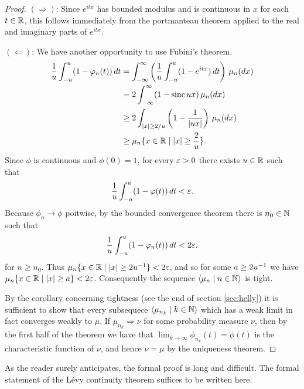 \documentclass{article}
\theoremstyle{definition}
\newcommand{\bldset}[2]{\{{#1}\mid{#2}\}}
\newcommand{\bldseq}[2]{\langle{#1}\mid{#2}\rangle}
\newcommand\sinc{\mathop{\text{sinc}}\nolimits}
\begin{document}
\begin{proof}
$(\Longrightarrow)$: Since $e^{itx}$ has bounded modulus and is continuous in $x$ for each $t \in \mathbb{R}$, this follows immediately from the portmanteau theorem applied to the real and imaginary parts of $e^{itx}$.

$(\Longleftarrow)$: We have another opportunity to use Fubini's theorem.
\begin{align*}
\frac{1}{u} \int_{-u}^u (1 - \phi_n(t)) \, dt &= \int_{-\infty}^\infty \left(\frac{1}{u}\int_{-u}^u (1 - e^{itx}) \, dt\right) \, \mu_n(dx) \\
                                              &= 2\int_{-\infty}^\infty (1 - \sinc ux) \, \mu_n(dx) \\
                                              &\ge 2\int_{|x| \ge 2/u} \left(1 - \frac{1}{|ux|}\right) \, \mu_n(dx) \\
                                              &\ge \mu_n \bldset{x \in \R}{|x| \ge \frac{2}{u}}.
\end{align*}
Since $\phi$ is continuous and $\phi(0) = 1$, for every $\varepsilon > 0$ there exists $u \in \mathbb{R}$ such that
\[ \frac{1}{u} \int_{-u}^u (1 - \varphi(t)) \, dt < \varepsilon. \]
Because $\phi_n \rightarrow \phi$ poitwise, by the bounded convergence theorem there is $n_0 \in \mathbb{N}$ such that
\[ \frac{1}{u} \int_{-u}^u (1 - \varphi_n(t)) \, dt < 2\varepsilon. \]
for $n \ge n_0$. Thus $\mu_n \bldset{x \in \R}{|x| \ge 2u\inv} < 2\eps$, and so for some $a \ge 2u^{-1}$ we have $\mu_n \bldset{x \in \R}{|x| \ge a} < 2\eps$. Consequently the sequence $\bldseq{\mu_n}{n \in \N}$ is tight.

By the corollary concerning tightness (see the end of section \ref{sec:helly}) it is sufficient to show that every subsequece $\bldseq{\mu_{n_k}}{k \in \N}$ which has a weak limit in fact converges weakly to $\mu$. If $\mu_{n_k} \Rightarrow \nu$ for some probability measure $\nu$, then by the first half of the theorem we have that $\lim_{k \rightarrow \infty} \phi_{n_k}(t) = \phi(t)$ is the characteristic function of $\nu$, and hence $\nu = \mu$ by the uniqueness theorem.
\end{proof}

As the reader surely anticipates, the formal proof is long and difficult. The formal statement of the L\'evy continuity theorem suffices to be written here.

\medskip
\end{document}
